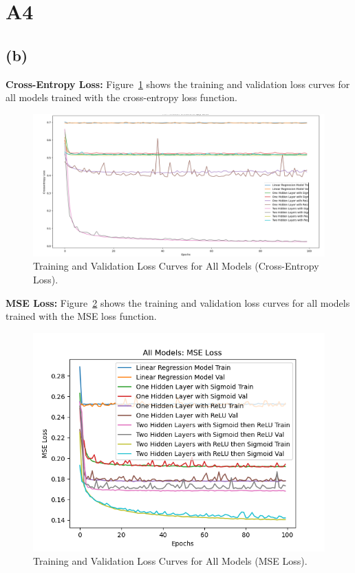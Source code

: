 \documentclass{article}
\begin{document}
\section*{A4}

\subsection*{(b)}

\textbf{Cross-Entropy Loss:} Figure~\ref{fig:ce_loss} shows the training and validation loss curves for all models trained with the cross-entropy loss function.

\begin{figure}[ht]
    \centering
    \includegraphics[width=0.7\linewidth]{cross_entropy_loss.png}
    \caption{Training and Validation Loss Curves for All Models (Cross-Entropy Loss).}
    \label{fig:ce_loss}
\end{figure}

\textbf{MSE Loss:} Figure~\ref{fig:mse_loss} shows the training and validation loss curves for all models trained with the MSE loss function.

\begin{figure}[ht]
    \centering
    \includegraphics[width=0.7\linewidth]{mse_loss.png}
    \caption{Training and Validation Loss Curves for All Models (MSE Loss).}
    \label{fig:mse_loss}
\end{figure}
\end{document}
